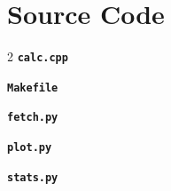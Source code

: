 \documentclass[10pt,a4paper,openany,oneside]{book}
\newcommand{\file}[1]{\texttt{#1}}
\begin{document}
\chapter{Source Code}
\vspace{-12pt}
\begin{multicols}{2}
\noindent\textbf{\file{calc.cpp}}


\noindent\textbf{\file{Makefile}}


\noindent\textbf{\file{fetch.py}}


\noindent\textbf{\file{plot.py}}


\noindent\textbf{\file{stats.py}}

\end{multicols}
\end{document}
